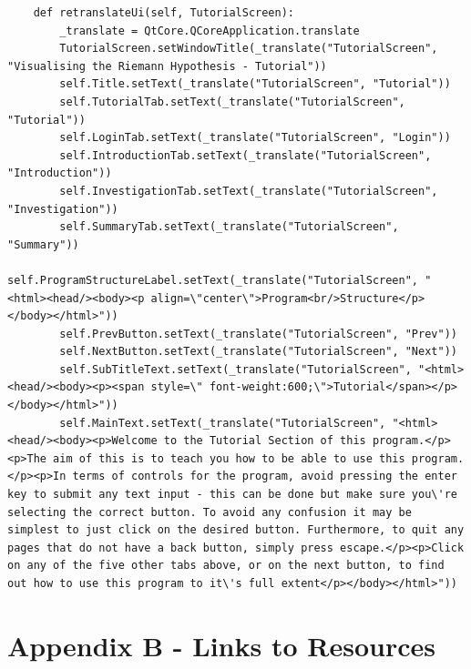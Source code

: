 \documentclass[12pt]{article}
\begin{document}
\begin{lstlisting}
    def retranslateUi(self, TutorialScreen):
        _translate = QtCore.QCoreApplication.translate
        TutorialScreen.setWindowTitle(_translate("TutorialScreen", "Visualising the Riemann Hypothesis - Tutorial"))
        self.Title.setText(_translate("TutorialScreen", "Tutorial"))
        self.TutorialTab.setText(_translate("TutorialScreen", "Tutorial"))
        self.LoginTab.setText(_translate("TutorialScreen", "Login"))
        self.IntroductionTab.setText(_translate("TutorialScreen", "Introduction"))
        self.InvestigationTab.setText(_translate("TutorialScreen", "Investigation"))
        self.SummaryTab.setText(_translate("TutorialScreen", "Summary"))
        self.ProgramStructureLabel.setText(_translate("TutorialScreen", "<html><head/><body><p align=\"center\">Program<br/>Structure</p></body></html>"))
        self.PrevButton.setText(_translate("TutorialScreen", "Prev"))
        self.NextButton.setText(_translate("TutorialScreen", "Next"))
        self.SubTitleText.setText(_translate("TutorialScreen", "<html><head/><body><p><span style=\" font-weight:600;\">Tutorial</span></p></body></html>"))
        self.MainText.setText(_translate("TutorialScreen", "<html><head/><body><p>Welcome to the Tutorial Section of this program.</p><p>The aim of this is to teach you how to be able to use this program.</p><p>In terms of controls for the program, avoid pressing the enter key to submit any text input - this can be done but make sure you\'re selecting the correct button. To avoid any confusion it may be simplest to just click on the desired button. Furthermore, to quit any pages that do not have a back button, simply press escape.</p><p>Click on any of the five other tabs above, or on the next button, to find out how to use this program to it\'s full extent</p></body></html>"))
\end{lstlisting}


\clearpage
\section{Appendix B - Links to Resources}
\end{document}
